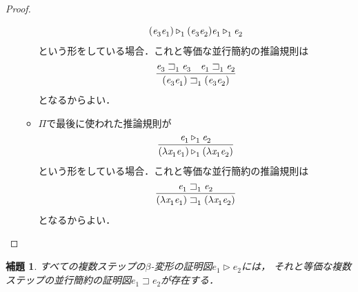 \documentclass{ltjsbook}%
\newtheorem{lemma}{補題}[section]%
\begin{document}
\begin{proof}
\begin{itemize}
\begin{itemize}
\begin{equation}
{        (\mathit{e}_3^{}\mathit{e}_1^{})\triangleright_1^{}(\mathit{e}_3^{}\mathit{e}_2^{})%
      }{%
        \mathit{e}_1^{}\triangleright_1^{}\mathit{e}_2^{}%
      }%
    \end{equation}%
    という形をしている場合．これと等価な並行簡約の推論規則は%
    \begin{equation}%
      \infer{%
        (\mathit{e}_3^{}\mathit{e}_1^{})\sqsupset_1^{}(\mathit{e}_3^{}\mathit{e}_2^{})%
      }{%
        \mathit{e}_3^{}\sqsupset_1^{}\mathit{e}_3^{}%
      &%
        \mathit{e}_1^{}\sqsupset_1^{}\mathit{e}_2^{}%
      }%
    \end{equation}%
    となるからよい．%
    \item$\Pi$で最後に使われた推論規則が%
    \begin{equation}%
      \infer{%
        (\lambda\mathit{x}_1^{}\mathit{e}_1^{})\triangleright_1^{}%
        (\lambda\mathit{x}_1^{}\mathit{e}_2^{})%
      }{%
        \mathit{e}_1^{}\triangleright_1^{}\mathit{e}_2^{}%
      }%
    \end{equation}%
    という形をしている場合．これと等価な並行簡約の推論規則は%
    \begin{equation}%
      \infer{%
        (\lambda\mathit{x}_1^{}\mathit{e}_1^{})\sqsupset_1^{}%
        (\lambda\mathit{x}_1^{}\mathit{e}_2^{})%
      }{%
        \mathit{e}_1^{}\sqsupset_1^{}\mathit{e}_2^{}%
      }%
    \end{equation}%
    となるからよい．%
    \end{itemize}%
  \end{itemize}%
\end{proof}%
\begin{lemma}%
  \label{lemma:betapar}%
  すべての複数ステップの$\beta$-変形の証明図$\mathit{e}_1^{}\triangleright\mathit{e}_2^{}$には，%
  それと等価な複数ステップの並行簡約の証明図$\mathit{e}_1^{}\sqsupset\mathit{e}_2^{}$が存在する．%
\end{lemma}%
\end{document}
